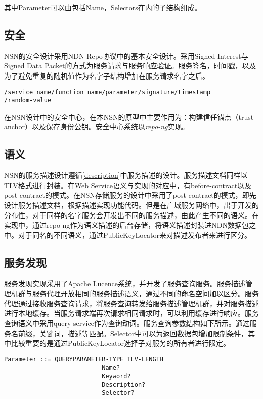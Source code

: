 其中Parameter可以由包括Name，Selectors在内的子结构组成。

\subsection{安全}
NSN的安全设计采用NDN Repo协议中的基本安全设计。采用Signed Interest与Signed Data Packet的方式为服务请求与服务响应验证。服务签名，时间戳，以及为了避免重复的随机值作为名字子结构增加在服务请求名字之后。
\begin{framed}
\begin{verbatim}
/service name/function name/parameter/signature/timestamp
/random-value
\end{verbatim}
\end{framed}

在NSN设计中的安全中心，在本NSN的原型中主要作用为：构建信任锚点（trust anchor）以及保存身份公钥。安全中心系统以\textit{repo-ng}实现。

\subsection{语义}
NSN的服务描述设计遵循\ref{description}中服务描述的设计。服务描述文档同样以TLV格式进行封装。在Web Service语义与实现的对应中，有before-contract以及post-contract的模式。在NSN存储服务的设计中采用了post-contract的模式，即先设计服务描述文档，根据描述实现功能代码。但是在广域服务网络中，出于开发的分布性，对于同样的名字服务会开发出不同的服务描述，由此产生不同的语义。在实现中，通过repo-ng作为语义描述的后台存储，将语义描述封装进NDN数据包之中。对于同名的不同语义，通过PublicKeyLocator来对描述发布者来进行区分。

\subsection{服务发现}
服务发现实现采用了Apache Lucence系统，并开发了服务查询服务。服务描述管理机群与服务代理开放相同的服务描述语义，通过不同的命名空间加以区分。服务代理通过接收服务查询请求，将服务查询转发给服务描述管理机群，并对服务描述进行本地缓存。当服务请求端再次请求相同请求时，可以利用缓存进行响应。服务查询语义中采用query-service作为查询动词。服务查询参数结构如下所示。通过服务名前缀，关键词，描述等匹配。Selector中可以为返回数据包增加限制条件，其中比较重要的是通过PublicKeyLocator选择子对服务的所有者进行限定。

\begin{framed}
\begin{verbatim}
Parameter ::= QUERYPARAMETER-TYPE TLV-LENGTH
                           Name?
                           Keyword?
                           Description?
                           Selector?
\end{verbatim}
\end{framed}

